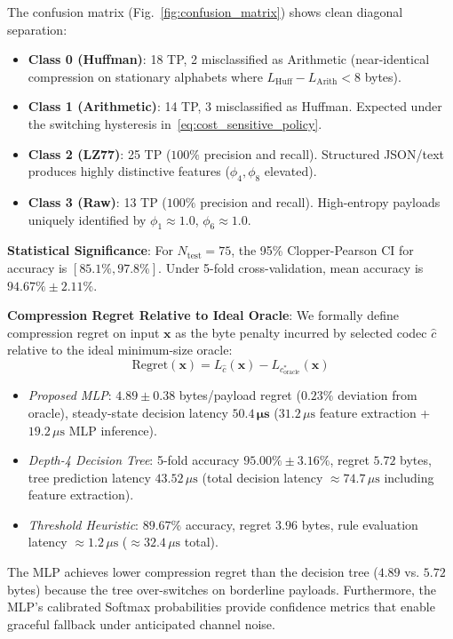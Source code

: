 \documentclass[conference]{IEEEtran}
\begin{document}
The confusion matrix (Fig.~\ref{fig:confusion_matrix}) shows clean diagonal separation:
\begin{itemize}
    \item \textbf{Class 0 (Huffman)}: 18 TP, 2 misclassified as Arithmetic (near-identical compression on stationary alphabets where $L_{\text{Huff}} - L_{\text{Arith}} < 8$ bytes).
    \item \textbf{Class 1 (Arithmetic)}: 14 TP, 3 misclassified as Huffman. Expected under the switching hysteresis in~\eqref{eq:cost_sensitive_policy}.
    \item \textbf{Class 2 (LZ77)}: 25 TP ($100\%$ precision and recall). Structured JSON/text produces highly distinctive features ($\phi_4, \phi_8$ elevated).
    \item \textbf{Class 3 (Raw)}: 13 TP ($100\%$ precision and recall). High-entropy payloads uniquely identified by $\phi_1 \approx 1.0$, $\phi_6 \approx 1.0$.
\end{itemize}

\textbf{Statistical Significance}: For $N_{\text{test}} = 75$, the 95\% Clopper-Pearson CI for accuracy is $[85.1\%, 97.8\%]$. Under 5-fold cross-validation, mean accuracy is $94.67\% \pm 2.11\%$.

\textbf{Compression Regret Relative to Ideal Oracle}: We formally define compression regret on input $\mathbf{x}$ as the byte penalty incurred by selected codec $\hat{c}$ relative to the ideal minimum-size oracle:
\begin{equation}
    \text{Regret}(\mathbf{x}) = L_{\hat{c}}(\mathbf{x}) - L_{c^*_{\text{oracle}}}(\mathbf{x})
\end{equation}
\begin{itemize}
    \item \textit{Proposed MLP}: $\mathbf{4.89 \pm 0.38}$ bytes/payload regret ($0.23\%$ deviation from oracle), steady-state decision latency $\mathbf{50.4\,\mu\text{s}}$ ($31.2\,\mu\text{s}$ feature extraction + $19.2\,\mu\text{s}$ MLP inference).
    \item \textit{Depth-4 Decision Tree}: 5-fold accuracy $95.00\% \pm 3.16\%$, regret $\mathbf{5.72}$ bytes, tree prediction latency $43.52\,\mu\text{s}$ (total decision latency $\approx\!74.7\,\mu\text{s}$ including feature extraction).
    \item \textit{Threshold Heuristic}: $89.67\%$ accuracy, regret $3.96$ bytes, rule evaluation latency $\approx\!1.2\,\mu\text{s}$ ($\approx\!32.4\,\mu\text{s}$ total).
\end{itemize}
The MLP achieves lower compression regret than the decision tree ($4.89$ vs. $5.72$ bytes) because the tree over-switches on borderline payloads. Furthermore, the MLP's calibrated Softmax probabilities provide confidence metrics that enable graceful fallback under anticipated channel noise.
\end{document}
